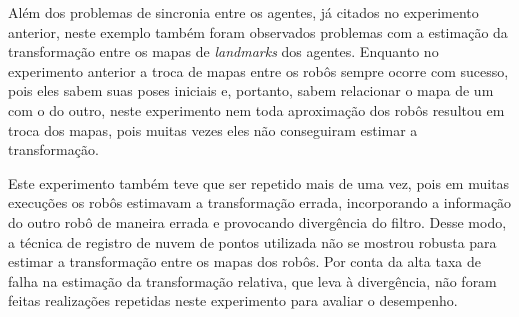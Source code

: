 Além dos problemas de sincronia entre os agentes, já citados no experimento 
anterior, neste exemplo também foram observados problemas com a estimação 
da transformação entre os mapas de \textit{landmarks} dos agentes. 
Enquanto no experimento anterior a troca de mapas entre os robôs sempre 
ocorre com sucesso, pois eles sabem suas poses iniciais e, portanto, sabem 
relacionar o mapa de um com o do outro, neste experimento nem toda aproximação dos 
robôs resultou em troca dos mapas, pois muitas vezes eles não conseguiram 
estimar a transformação.

Este experimento também teve que ser repetido mais de uma vez, pois em 
muitas execuções os robôs estimavam a transformação errada, incorporando 
a informação do outro robô de maneira errada e provocando divergência do 
filtro. Desse modo, a técnica de registro de nuvem de pontos utilizada 
não se mostrou robusta para estimar a transformação entre os mapas dos robôs. Por conta da alta taxa de falha na estimação da transformação 
relativa, que leva à divergência, não foram feitas realizações 
repetidas neste experimento para avaliar o desempenho.

